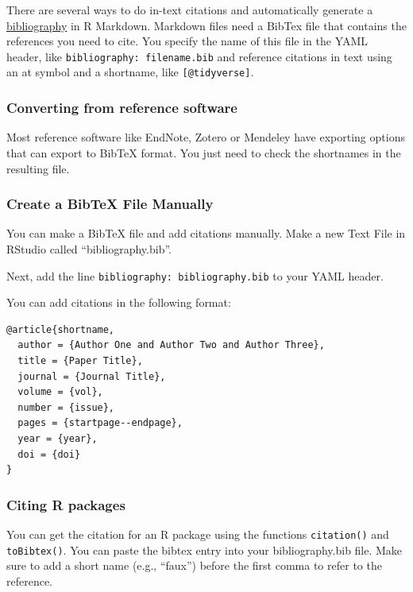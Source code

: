 \documentclass[
  oneside]{book}
\begin{document}
There are several ways to do in-text citations and automatically generate a \href{https://rmarkdown.rstudio.com/authoring_bibliographies_and_citations.html\#bibliographies}{bibliography} in R Markdown. Markdown files need a BibTex file that contains the references you need to cite. You specify the name of this file in the YAML header, like \texttt{bibliography:\ filename.bib} and reference citations in text using an at symbol and a shortname, like \texttt{{[}@tidyverse{]}}.

\hypertarget{converting-from-reference-software}{%
\subsubsection{Converting from reference software}\label{converting-from-reference-software}}

Most reference software like EndNote, Zotero or Mendeley have exporting options that can export to BibTeX format. You just need to check the shortnames in the resulting file.

\hypertarget{create-a-bibtex-file-manually}{%
\subsubsection{Create a BibTeX File Manually}\label{create-a-bibtex-file-manually}}

You can make a BibTeX file and add citations manually. Make a new Text File in RStudio called ``bibliography.bib''.

Next, add the line \texttt{bibliography:\ bibliography.bib} to your YAML header.

You can add citations in the following format:

\begin{verbatim}
@article{shortname,
  author = {Author One and Author Two and Author Three},
  title = {Paper Title},
  journal = {Journal Title},
  volume = {vol},
  number = {issue},
  pages = {startpage--endpage},
  year = {year},
  doi = {doi}
}
\end{verbatim}

\hypertarget{citing-r-packages}{%
\subsubsection{Citing R packages}\label{citing-r-packages}}

You can get the citation for an R package using the functions \texttt{citation()} and \texttt{toBibtex()}. You can paste the bibtex entry into your bibliography.bib file. Make sure to add a short name (e.g., ``faux'') before the first comma to refer to the reference.
\end{document}
